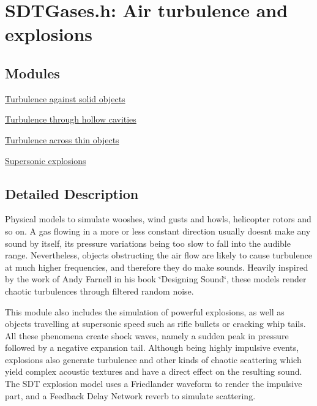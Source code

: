 \hypertarget{group__gases}{}\section{S\+D\+T\+Gases.\+h\+: Air turbulence and explosions}
\label{group__gases}
\subsection*{Modules}
\begin{DoxyCompactItemize}
\item 
\hyperlink{group__windflow}{Turbulence against solid objects}
\item 
\hyperlink{group__windcavity}{Turbulence through hollow cavities}
\item 
\hyperlink{group__windkarman}{Turbulence across thin objects}
\item 
\hyperlink{group__explosions}{Supersonic explosions}
\end{DoxyCompactItemize}


\subsection{Detailed Description}
Physical models to simulate wooshes, wind gusts and howls, helicopter rotors and so on. A gas flowing in a more or less constant direction usually doesn\textquotesingle{}t make any sound by itself, its pressure variations being too slow to fall into the audible range. Nevertheless, objects obstructing the air flow are likely to cause turbulence at much higher frequencies, and therefore they do make sounds. Heavily inspired by the work of Andy Farnell in his book \char`\"{}\+Designing Sound\char`\"{}, these models render chaotic turbulences through filtered random noise.

This module also includes the simulation of powerful explosions, as well as objects travelling at supersonic speed such as rifle bullets or cracking whip tails. All these phenomena create shock waves, namely a sudden peak in pressure followed by a negative expansion tail. Although being highly impulsive events, explosions also generate turbulence and other kinds of chaotic scattering which yield complex acoustic textures and have a direct effect on the resulting sound. The S\+D\+T explosion model uses a Friedlander waveform to render the impulsive part, and a Feedback Delay Network reverb to simulate scattering. 